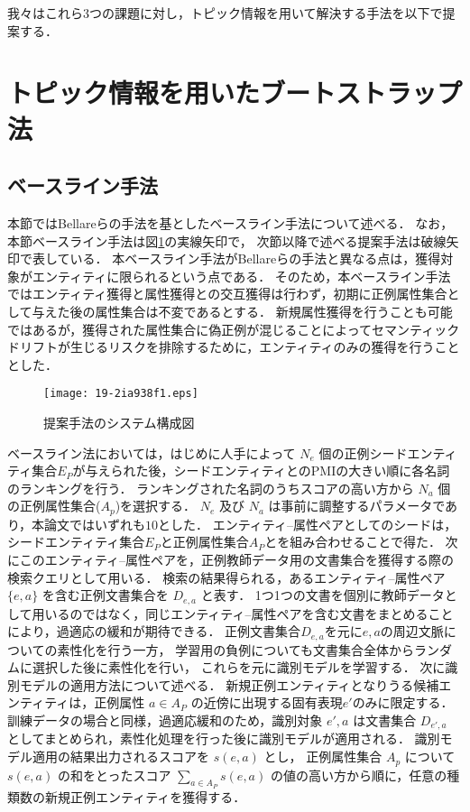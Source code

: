 \documentclass[japanese]{jnlp_1.4}
\begin{document}
我々はこれら3つの課題に対し，トピック情報を用いて解決する手法を以下で提案する．




\section{トピック情報を用いたブートストラップ法}
\label{sec:propose}

\subsection{ベースライン手法}
\label{sec:baseline}

本節ではBellareらの手法を基としたベースライン手法について述べる．
なお，本節ベースライン手法は図\ref{fig:structure}の実線矢印で，
次節以降で述べる提案手法は破線矢印で表している．
本ベースライン手法がBellareらの手法と異なる点は，獲得対象がエンティティに限られるという点である．
そのため，本ベースライン手法ではエンティティ獲得と属性獲得との交互獲得は行わず，初期に正例属性集合として与えた後の属性集合は不変であるとする．
新規属性獲得を行うことも可能ではあるが，獲得された属性集合に偽正例が混じることによってセマンティックドリフトが生じるリスクを排除するために，エンティティのみの獲得を行うこととした．

\begin{figure}[t]
\begin{center}
\texttt{[image: 19-2ia938f1.eps]}
\end{center}
\caption{提案手法のシステム構成図}
\label{fig:structure}
\end{figure}



ベースライン法においては，はじめに人手によって $N_e$ 個の正例シードエンティティ集合$E_P$が与えられた後，シードエンティティとのPMIの大きい順に各名詞のランキングを行う．
ランキングされた名詞のうちスコアの高い方から $N_a$ 個の正例属性集合($A_p$)を選択する．
$N_e$ 及び $N_a$ は事前に調整するパラメータであり，本論文ではいずれも$10$とした．
エンティティ--属性ペアとしてのシードは，シードエンティティ集合$E_P$と正例属性集合$A_P$とを組み合わせることで得た．
次にこのエンティティ--属性ペアを，正例教師データ用の文書集合を獲得する際の検索クエリとして用いる．
検索の結果得られる，あるエンティティ--属性ペア $\{e,a\}$  を含む正例文書集合を $D_{e,a}$ と表す．
1つ1つの文書を個別に教師データとして用いるのではなく，同じエンティティ--属性ペアを含む文書をまとめることにより，過適応の緩和が期待できる．
正例文書集合$D_{e,a}$を元に$e,a$の周辺文脈についての素性化を行う一方，
学習用の負例についても文書集合全体からランダムに選択した後に素性化を行い，
これらを元に識別モデルを学習する．
次に識別モデルの適用方法について述べる．
新規正例エンティティとなりうる候補エンティティは，正例属性 $a \in A_P$ の近傍に出現する固有表現$e'$のみに限定する．
訓練データの場合と同様，過適応緩和のため，識別対象 $e',a$ は文書集合 $D_{e',a}$ としてまとめられ，素性化処理を行った後に識別モデルが適用される．
識別モデル適用の結果出力されるスコアを $s(e,a)$ とし，
正例属性集合 $A_p$ について $s(e,a)$ の和をとったスコア $\sum_{a\in A_P} s(e,a)$ の値の高い方から順に，任意の種類数の新規正例エンティティを獲得する．
\end{document}
